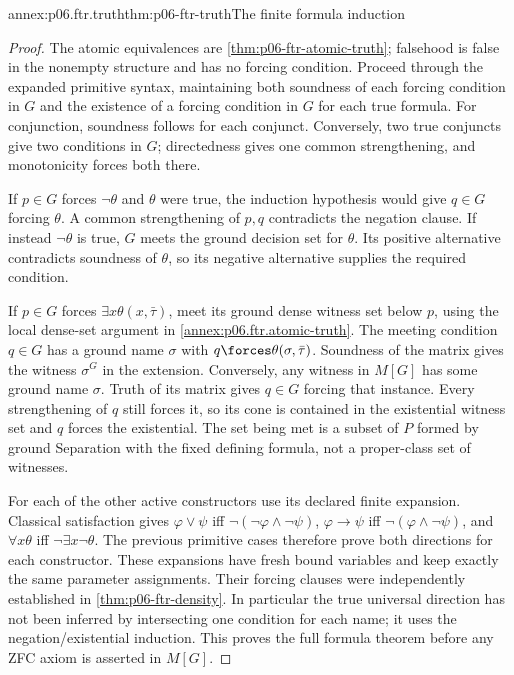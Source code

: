 \begin{annexitem}{annex:p06.ftr.truth}{thm:p06-ftr-truth}{The finite formula induction}
\begin{proof}
The atomic equivalences are \cref{thm:p06-ftr-atomic-truth}; falsehood is
false in the nonempty structure and has no forcing condition. Proceed through
the expanded primitive syntax, maintaining both soundness of each forcing
condition in \(G\) and the existence of a forcing condition in \(G\)
for each true formula. For conjunction, soundness follows for each conjunct.
Conversely, two true conjuncts give two conditions in \(G\); directedness
gives one common strengthening, and monotonicity forces both there.

If \(p\in G\) forces \(\neg\theta\) and \(\theta\) were true, the
induction hypothesis would give \(q\in G\) forcing \(\theta\). A common
strengthening of \(p,q\) contradicts the negation clause. If instead
\(\neg\theta\) is true, \(G\) meets the ground decision set for
\(\theta\). Its positive alternative contradicts soundness of \(\theta\),
so its negative alternative supplies the required condition.

If \(p\in G\) forces \(\exists x\theta(x,\bar\tau)\), meet its
ground dense witness set below \(p\), using the local dense-set argument
in \cref{annex:p06.ftr.atomic-truth}. The meeting condition \(q\in G\)
has a ground name \(\sigma\) with \(q\forces\theta(\sigma,\bar\tau)\).
Soundness of the matrix gives the witness \(\sigma^G\) in the extension.
Conversely, any witness in \(M[G]\) has some ground name \(\sigma\).
Truth of its matrix gives \(q\in G\) forcing that instance. Every
strengthening of \(q\) still forces it, so its cone is contained in
the existential witness set and \(q\) forces the existential.
The set being met is a subset of \(P\) formed by ground Separation with
the fixed defining formula, not a proper-class set of witnesses.

For each of the other active constructors use its declared finite expansion.
Classical satisfaction gives
\(\varphi\lor\psi\) iff \(\neg(\neg\varphi\land\neg\psi)\),
\(\varphi\to\psi\) iff \(\neg(\varphi\land\neg\psi)\), and
\(\forall x\theta\) iff \(\neg\exists x\neg\theta\). The previous
primitive cases therefore prove both directions for each constructor.
These expansions have fresh bound variables and keep exactly the same
parameter assignments. Their forcing clauses were independently established
in \cref{thm:p06-ftr-density}. In particular the true universal direction
has not been inferred by intersecting one condition for each name; it uses
the negation/existential induction. This proves the full formula theorem
before any ZFC axiom is asserted in \(M[G]\).
\end{proof}
\end{annexitem}

